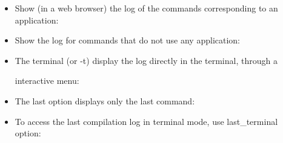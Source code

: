 \documentclass[a4paper,10pt,english]{sphinxmanual}
\begin{document}
\label{\detokenize{commands/log:usage}}\begin{itemize}
\item {} 
Show (in a web browser) the log of the commands corresponding to an application:

%
\begin{sphinxVerbatim}[commandchars=\\\{\}]
  
\end{sphinxVerbatim}

\item {} 
Show the log for commands that do not use any application:

%
\begin{sphinxVerbatim}[commandchars=\\\{\}]
 
\end{sphinxVerbatim}

\item {} 
The \textendash{}terminal (or -t) display the log directly in the terminal, through a %
\begin{footnote}[9]\sphinxAtStartFootnote
{}
%
\end{footnote} interactive menu:

%
\begin{sphinxVerbatim}[commandchars=\\\{\}]
   
\end{sphinxVerbatim}

\item {} 
The \textendash{}last option displays only the last command:

%
\begin{sphinxVerbatim}[commandchars=\\\{\}]
   
\end{sphinxVerbatim}

\item {} 
To access the last compilation log in terminal mode, use \textendash{}last\_terminal option:


\end{itemize}
\end{document}
